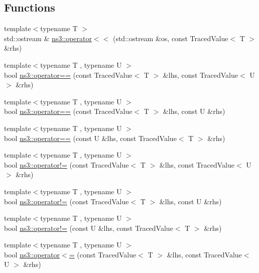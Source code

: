 \subsection*{Functions}
\begin{DoxyCompactItemize}
\item 
{\footnotesize template$<$typename T $>$ }\\std\+::ostream \& \hyperlink{group__tracing_gaea0ffe48a5b23b7d6997c9c2aa97316a}{ns3\+::operator$<$$<$} (std\+::ostream \&os, const Traced\+Value$<$ T $>$ \&rhs)
\item 
{\footnotesize template$<$typename T , typename U $>$ }\\bool \hyperlink{group__tracing_ga76eee541dbcb3b4d52efa17a4b83f5bb}{ns3\+::operator==} (const Traced\+Value$<$ T $>$ \&lhs, const Traced\+Value$<$ U $>$ \&rhs)
\item 
{\footnotesize template$<$typename T , typename U $>$ }\\bool \hyperlink{group__tracing_gaa872fc7a29aa663abe83d9b2ee544e68}{ns3\+::operator==} (const Traced\+Value$<$ T $>$ \&lhs, const U \&rhs)
\item 
{\footnotesize template$<$typename T , typename U $>$ }\\bool \hyperlink{group__tracing_gabd559ab613ecee06972fbd65916f38f1}{ns3\+::operator==} (const U \&lhs, const Traced\+Value$<$ T $>$ \&rhs)
\item 
{\footnotesize template$<$typename T , typename U $>$ }\\bool \hyperlink{group__tracing_gabafb92247bf8eefb46bf989cae3e2823}{ns3\+::operator!=} (const Traced\+Value$<$ T $>$ \&lhs, const Traced\+Value$<$ U $>$ \&rhs)
\item 
{\footnotesize template$<$typename T , typename U $>$ }\\bool \hyperlink{group__tracing_gaffa345d32c4a5532362d9b794e1c2d0d}{ns3\+::operator!=} (const Traced\+Value$<$ T $>$ \&lhs, const U \&rhs)
\item 
{\footnotesize template$<$typename T , typename U $>$ }\\bool \hyperlink{group__tracing_gaf51f6117120d2bd99aa3a5706549336f}{ns3\+::operator!=} (const U \&lhs, const Traced\+Value$<$ T $>$ \&rhs)
\item 
{\footnotesize template$<$typename T , typename U $>$ }\\bool \hyperlink{group__tracing_ga53ba0e46ad28e628394cbdb9520ef285}{ns3\+::operator$<$=} (const Traced\+Value$<$ T $>$ \&lhs, const Traced\+Value$<$ U $>$ \&rhs)
\item 

\end{DoxyCompactItemize}
